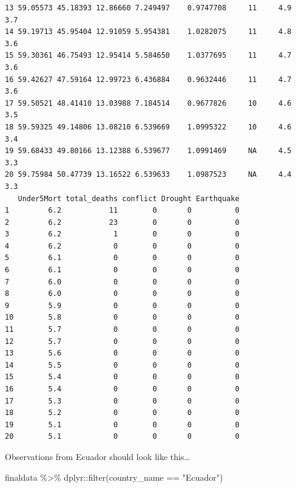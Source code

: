 \documentclass[
  letterpaper,
  DIV=11,
  numbers=noendperiod]{scrartcl}
\newenvironment{Shaded}{\begin{snugshade}}{\end{snugshade}}
\newcommand{\FunctionTok}[1]{\textcolor[rgb]{0.28,0.35,0.67}{#1}}
\newcommand{\NormalTok}[1]{\textcolor[rgb]{0.00,0.23,0.31}{#1}}
\newcommand{\SpecialCharTok}[1]{\textcolor[rgb]{0.37,0.37,0.37}{#1}}
\newcommand{\StringTok}[1]{\textcolor[rgb]{0.13,0.47,0.30}{#1}}
\begin{document}
\begin{verbatim}
13 59.05573 45.18393 12.86660 7.249497    0.9747708     11     4.9          3.7
14 59.19713 45.95404 12.91059 5.954381    1.0282075     11     4.8          3.6
15 59.30361 46.75493 12.95414 5.584650    1.0377695     11     4.7          3.6
16 59.42627 47.59164 12.99723 6.436884    0.9632446     11     4.7          3.6
17 59.50521 48.41410 13.03988 7.184514    0.9677826     10     4.6          3.5
18 59.59325 49.14806 13.08210 6.539669    1.0995322     10     4.6          3.4
19 59.68433 49.80166 13.12388 6.539677    1.0991469     NA     4.5          3.3
20 59.75984 50.47739 13.16522 6.539633    1.0987523     NA     4.4          3.3
   Under5Mort total_deaths conflict Drought Earthquake
1         6.2           11        0       0          0
2         6.2           23        0       0          0
3         6.2            1        0       0          0
4         6.2            0        0       0          0
5         6.1            0        0       0          0
6         6.1            0        0       0          0
7         6.0            0        0       0          0
8         6.0            0        0       0          0
9         5.9            0        0       0          0
10        5.8            0        0       0          0
11        5.7            0        0       0          0
12        5.7            0        0       0          0
13        5.6            0        0       0          0
14        5.5            0        0       0          0
15        5.4            0        0       0          0
16        5.4            0        0       0          0
17        5.3            0        0       0          0
18        5.2            0        0       0          0
19        5.1            0        0       0          0
20        5.1            0        0       0          0
\end{verbatim}

Observations from Ecuador should look like this\ldots{}

\begin{Shaded}
\begin{Highlighting}[]
\NormalTok{finaldata }\SpecialCharTok{\%\textgreater{}\%}
\NormalTok{  dplyr}\SpecialCharTok{::}\FunctionTok{filter}\NormalTok{(country\_name }\SpecialCharTok{==} \StringTok{"Ecuador"}\NormalTok{)}
\end{Highlighting}
\end{Shaded}
\end{document}
